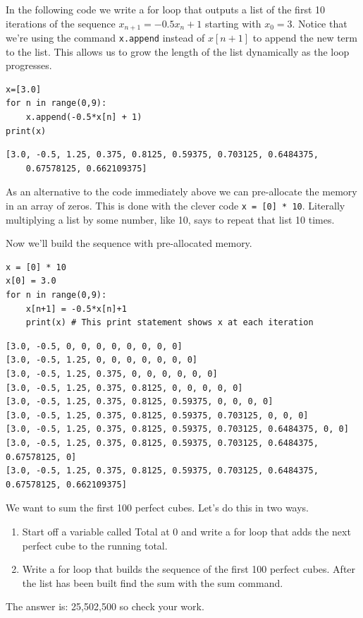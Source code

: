 \begin{example}
    In the following code we write a for loop that outputs a list of the first 10
    iterations of the sequence  $x_{n+1}=-0.5x_n+1$ starting with  $x_0=3$. Notice that
    we're using the command \texttt{x.append} instead of $x[n+1]$ to append the new term to the list.
    This allows us to grow the length of the list dynamically as the loop progresses.

    \bcode
\begin{lstlisting}
x=[3.0]
for n in range(0,9):
    x.append(-0.5*x[n] + 1)
print(x)
\end{lstlisting}
\boutput
\begin{lstlisting}
[3.0, -0.5, 1.25, 0.375, 0.8125, 0.59375, 0.703125, 0.6484375, 
    0.67578125, 0.662109375]
\end{lstlisting}
\end{example}
As an alternative to the code immediately above we can pre-allocate the memory in an array
of zeros. This is done with the clever code \texttt{x = [0] * 10}. Literally multiplying a
list by some number, like 10, says to repeat that list 10 times.

\begin{example}
    Now we'll build the sequence with pre-allocated memory.

    \bcode
\begin{lstlisting}
x = [0] * 10
x[0] = 3.0
for n in range(0,9):
    x[n+1] = -0.5*x[n]+1
    print(x) # This print statement shows x at each iteration
\end{lstlisting}
\boutput
\begin{lstlisting}
[3.0, -0.5, 0, 0, 0, 0, 0, 0, 0, 0]
[3.0, -0.5, 1.25, 0, 0, 0, 0, 0, 0, 0]
[3.0, -0.5, 1.25, 0.375, 0, 0, 0, 0, 0, 0]
[3.0, -0.5, 1.25, 0.375, 0.8125, 0, 0, 0, 0, 0]
[3.0, -0.5, 1.25, 0.375, 0.8125, 0.59375, 0, 0, 0, 0]
[3.0, -0.5, 1.25, 0.375, 0.8125, 0.59375, 0.703125, 0, 0, 0]
[3.0, -0.5, 1.25, 0.375, 0.8125, 0.59375, 0.703125, 0.6484375, 0, 0]
[3.0, -0.5, 1.25, 0.375, 0.8125, 0.59375, 0.703125, 0.6484375, 0.67578125, 0]
[3.0, -0.5, 1.25, 0.375, 0.8125, 0.59375, 0.703125, 0.6484375, 0.67578125, 0.662109375]
\end{lstlisting}
\end{example}

\begin{problem}
    We want to sum the first 100 perfect cubes. Let's do this in two ways.

    \begin{enumerate}
        \item Start off a variable called Total at 0 and write a for loop that adds the
            next perfect cube to the running total.
        \item  Write a for loop that builds the sequence of the first 100 perfect cubes.
            After the list has been built find the sum with the sum command.
    \end{enumerate}
    The answer is: 25,502,500 so check your work.
\end{problem}

